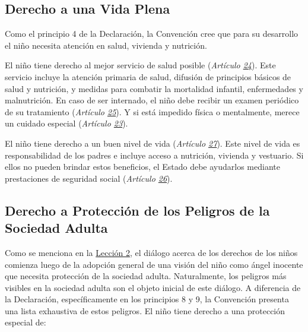 \documentclass{tufte-handout}
\begin{document}
\subsection{Derecho a una Vida Plena}\label{subsec:vida_plena}


Como el principio 4 de la Declaración, la Convención cree que para su desarrollo el niño necesita atención en salud, vivienda y nutrición.

El niño tiene derecho al mejor servicio de salud posible (\textit{Artículo \href{https://procosi.github.io/nenes/convencion/?a=24}{24}}). Este servicio incluye la atención primaria de salud, difusión de principios básicos de salud y nutrición, y medidas para combatir la mortalidad infantil, enfermedades y malnutrición. En caso de ser internado, el niño debe recibir un examen periódico de su tratamiento (\textit{Artículo \href{https://procosi.github.io/nenes/convencion/?a=25}{25}}). Y si está impedido física o mentalmente, merece un cuidado especial (\textit{Artículo \href{https://procosi.github.io/nenes/convencion/?a=23}{23}}).

El niño tiene derecho a un buen nivel de vida (\textit{Artículo \href{https://procosi.github.io/nenes/convencion/?a=27}{27}}). Este nivel de vida es responsabilidad de los padres e incluye acceso a nutrición, vivienda y vestuario. Si ellos no pueden brindar estos beneficios, el Estado debe ayudarlos mediante prestaciones de seguridad social (\textit{Artículo \href{https://procosi.github.io/nenes/convencion/?a=26}{26}}).

\subsection{Derecho a Protección de los Peligros de la Sociedad Adulta}\label{proteccion}


Como se menciona en la \hyperref[subsec:visiones]{Lección 2}, el diálogo acerca de los derechos de los niños comienza luego de la adopción general de una visión del niño como ángel inocente que necesita protección de la sociedad adulta. Naturalmente, los peligros más visibles en la sociedad adulta son el objeto inicial de este diálogo. A diferencia de la Declaración, específicamente en los principios 8 y 9, la Convención presenta una lista exhaustiva de estos peligros. El niño tiene derecho a una protección especial de:
\end{document}
